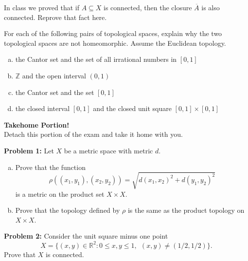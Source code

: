 \documentclass[11pt]{exam}
\theoremstyle{definition}
\begin{document}
\begin{questions}
\newpage
\question[10]\mbox{}
In class we proved that if $A\subseteq X$ is connected, then the closure $\overline{A}$ is also connected.
Reprove that fact here.

\newpage
\question[10]\mbox{}
For each of the following pairs of topological spaces, explain why the two topological spaces are not homeomorphic.  Assume the Euclidean topology.

\begin{enumerate}[(a)]
\item the Cantor set and the set of all irrational numbers in $[0,1]$
\vspace{1.5in}
\item $\mathbb Z$ and the open interval $(0,1)$
\vspace{1.5in}
\item the Cantor set and the set $[0,1]$
\vspace{1.5in}
\item the closed interval $[0,1]$ and the closed unit square $[0,1]\times [0,1]$
\end{enumerate}

\newpage
\textbf{Takehome Portion!}\\
Detach this portion of the exam and take it home with you.

\textbf{Problem 1:}
Let $X$ be a metric space with metric $d$.
\begin{enumerate}[(a)]
\item Prove that the function 
$$\rho((x_1,y_1),(x_2,y_2)) = \sqrt{d(x_1,x_2)^2+d(y_1,y_2)^2}$$
is a metric on the product set $X\times X$.
\item Prove that the topology defined by $\rho$ is the same as the product topology on $X\times X$.
\end{enumerate}

\textbf{Problem 2:}
Consider the unit square minus one point
$$X = \{(x,y)\in\mathbb R^2: 0\leq x,y\leq 1,\ \ (x,y)\neq(1/2,1/2)\}.$$
Prove that $X$ is connected.

\end{questions}
\end{document}
